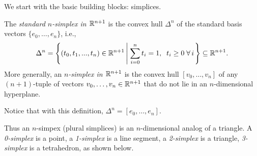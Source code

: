 \documentclass[11pt,a4paper]{report}
\begin{document}
	       We start with the basic building blocks: simplices.
		   
            \begin{defn}
			    \label {n-simplex} The \emph{standard $n$-simplex in $\mathbb{R}^{n+1}$} is the convex hull $\Delta^n$ of the standard basis vectors
			    $\{e_0,\ldots, e_n\}$, i.e.,
			    \[
			     \Delta^n = \left\{(t_0, t_1, ... , t_n) \in \mathbb{R}^{n+1} 
			     \left| \; \sum_{i=0}^n t_i = 1, \;  \; t_i \geq 0 \; \forall \, i\right. \right\}\subseteq \mathbb{R}^{n+1}.
			    \]
			    More generally, an \emph{$n$-simplex in $\mathbb{R}^{n+1}$} is the convex hull $[v_0,\ldots,v_n]$ of any $(n+1)$-tuple of
			    vectors $v_0,\ldots,v_n\in \mathbb{R}^{n+1}$ that do not lie in an $n$-dimensional hyperplane.
		      \end{defn}
		      
		      Notice that with this definition, $\Delta^n=[e_0,\ldots,e_n]$.
		      
		      
		      Thus an $n$-simpex (plural simplices) is an $n$-dimensional analog of a triangle.
		       A  \emph{0-simplex} is a point, a \emph{1-simplex} is a line segment, a \emph{2-simplex} is a triangle, \emph{3-simplex} is a tetrahedron, as shown below. \\
		      
\end{document}

